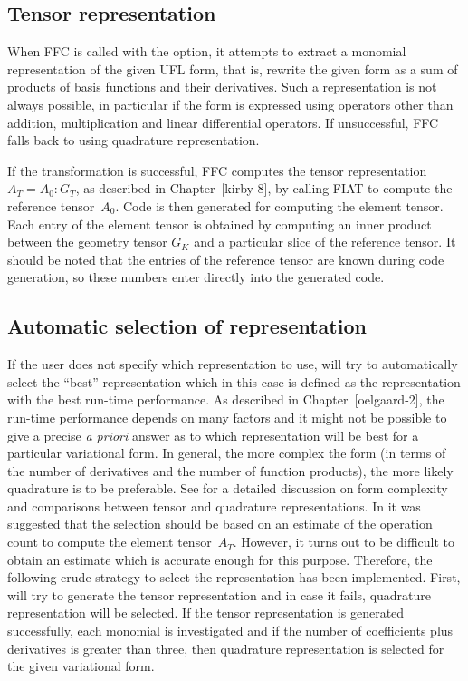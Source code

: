 \subsection{Tensor representation}

When FFC is called with the  option,
it attempts to extract a monomial representation of the given UFL
form, that is, rewrite the given form as a sum of products of basis
functions and their derivatives. Such a representation is not always
possible, in particular if the form is expressed using operators other
than addition, multiplication and linear differential operators. If
unsuccessful, FFC falls back to using quadrature representation.

If the transformation is successful, FFC computes the tensor
representation $A_T = A_0 : G_T$, as described in Chapter~[kirby-8],
by calling FIAT to compute the reference tensor~$A_0$. Code is then
generated for computing the element tensor. Each entry of the element
tensor is obtained by computing an inner product between the geometry
tensor $G_K$ and a particular slice of the reference tensor. It should
be noted that the entries of the reference tensor are known during
code generation, so these numbers enter directly into the generated
code.

\subsection{Automatic selection of representation}

If the user does not specify which representation to use, \ffc{} will
try to automatically select the ``best'' representation which in this
case is defined as the representation with the best run-time
performance. As described in Chapter~[oelgaard-2], the run-time
performance depends on many factors and it might not be possible to
give a precise \emph{a priori} answer as to which representation will
be best for a particular variational form. In general, the more
complex the form (in terms of the number of derivatives and the number
of function products), the more likely quadrature is to be
preferable. See \cite{OlgaardWells2010} for a detailed discussion on form
complexity and comparisons between tensor and quadrature
representations. In \cite{OlgaardWells2010} it was suggested that the
selection should be based on an estimate of the operation count to
compute the element tensor~$A_T$.  However, it turns out to be
difficult to obtain an estimate which is accurate enough for this
purpose. Therefore, the following crude strategy to select the
representation has been implemented. First, \ffc{} will try to
generate the tensor representation and in case it fails, quadrature
representation will be selected. If the tensor representation is
generated successfully, each monomial is investigated and if the
number of coefficients plus derivatives is greater than three, then
quadrature representation is selected for the given variational form.

